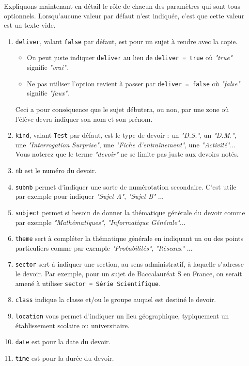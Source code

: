 \documentclass[12pt,a4paper]{scrartcl}
\theoremstyle{definition}
\begin{document}
Expliquons maintenant en détail le rôle de chacun des paramètres qui sont tous optionnels. Lorsqu'aucune valeur par défaut n'est indiquée, c'est que cette valeur est un texte vide.

\begin{enumerate}
	\item \verb+deliver+, valant \verb+false+ par défaut, est pour un sujet à rendre avec la copie. 
	\begin{itemize}[label=\textbullet]
		\setlength\itemsep{0em}

		\item On peut juste indiquer \verb+deliver+ au lieu de \verb+deliver = true+ où \emph{"true"} signifie \emph{"vrai"}.

		\item Ne pas utiliser l'option revient à passer par \verb+deliver = false+ où \emph{"false"} signifie \emph{"faux"}.
	\end{itemize}
	Ceci a pour conséquence que le sujet débutera, ou non, par une zone où l'élève devra indiquer son nom et son prénom.

	\item \verb+kind+, valant \verb+Test+ par défaut, est le type de devoir : un \emph{"D.S."}, un \emph{"D.M."}, une \emph{"Interrogation Surprise"}, une \emph{"Fiche d'entraînement"}, une \emph{"Activité"}...
	Vous noterez que le terme \emph{"devoir"} ne se limite pas juste aux devoirs notés.

	\item \verb+nb+ est le numéro du devoir.

	\item \verb+subnb+ permet d'indiquer une sorte de numérotation secondaire. C'est utile par exemple pour indiquer \emph{"Sujet A"}, \emph{"Sujet B"} ...

	\item \verb+subject+ permet si besoin de donner la thématique générale du devoir comme par exemple \emph{"Mathématiques"}, \emph{"Informatique Générale"}...

	\item \verb+theme+ sert à compléter la thématique générale en indiquant un ou des points particuliers comme par exemple \emph{"Probabilités"}, \emph{"Réseaux"} ...

	\item \verb+sector+ sert à indiquer une section, au sens administratif, à laquelle s'adresse le devoir. Par exemple, pour un sujet de Baccalauréat S en France, on serait amené à utiliser \verb+sector = Série Scientifique+.

	\item \verb+class+ indique la classe et/ou le groupe auquel est destiné le devoir.

	\item \verb+location+ vous permet d'indiquer un lieu géographique, typiquement un établissement scolaire ou universitaire.

	\item \verb+date+ est pour la date du devoir.

	\item \verb+time+ est pour la durée du devoir.
\end{enumerate}
\end{document}
